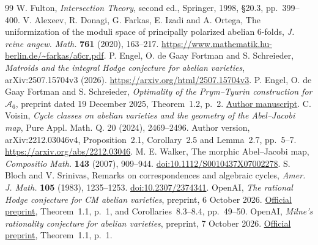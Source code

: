 \documentclass[11pt]{article}
\theoremstyle{definition}
\theoremstyle{remark}
\begin{document}
\begin{thebibliography}{99}
 W. Fulton, \emph{Intersection Theory}, second ed., Springer, 1998, \S20.3, pp.~399--400.
 V. Alexeev, R. Donagi, G. Farkas, E. Izadi and A. Ortega, The uniformization of the moduli space of principally polarized abelian 6-folds, \emph{J. reine angew. Math.} \textbf{761} (2020), 163--217. \url{https://www.mathematik.hu-berlin.de/~farkas/a6cr.pdf}.
 P. Engel, O. de Gaay Fortman and S. Schreieder, \emph{Matroids and the integral Hodge conjecture for abelian varieties}, arXiv:2507.15704v3 (2026). \url{https://arxiv.org/html/2507.15704v3}.
 P. Engel, O. de Gaay Fortman and S. Schreieder, \emph{Optimality of the Prym--Tyurin construction for $\mathcal A_6$}, preprint dated 19 December 2025, Theorem~1.2, p.~2. \href{https://www.iag.uni-hannover.de/fileadmin/iag/homepages/schreieder/publications/IHC_for_A_6.pdf}{Author manuscript}.
 C. Voisin, \emph{Cycle classes on abelian varieties and the geometry of the Abel--Jacobi map}, Pure Appl. Math. Q. 20 (2024), 2469--2496. Author version, arXiv:2212.03046v4, Proposition~2.1, Corollary~2.5 and Lemma~2.7, pp.~5--7. \url{https://arxiv.org/abs/2212.03046}.
 M. E. Walker, The morphic Abel--Jacobi map, \emph{Compositio Math.} \textbf{143} (2007), 909--944. \href{https://doi.org/10.1112/S0010437X07002278}{doi:10.1112/S0010437X07002278}.
 S. Bloch and V. Srinivas, Remarks on correspondences and algebraic cycles, \emph{Amer. J. Math.} \textbf{105} (1983), 1235--1253. \href{https://doi.org/10.2307/2374341}{doi:10.2307/2374341}.
 OpenAI, \emph{The rational Hodge conjecture for CM abelian varieties}, preprint, 6 October 2026. \href{https://github.com/openai/math/blob/main/preprints/The-rational-Hodge-conjecture-for-CM-abelian-varieties-October-6-2026/paper.pdf}{Official preprint}, Theorem~1.1, p.~1, and Corollaries~8.3--8.4, pp.~49--50.
 OpenAI, \emph{Milne's rationality conjecture for abelian varieties}, preprint, 7 October 2026. \href{https://github.com/openai/math/blob/main/preprints/Milnes-rationality-conjecture-for-abelian-varieties-October-7-2026/paper.pdf}{Official preprint}, Theorem~1.1, p.~1.
\end{thebibliography}
\end{document}
